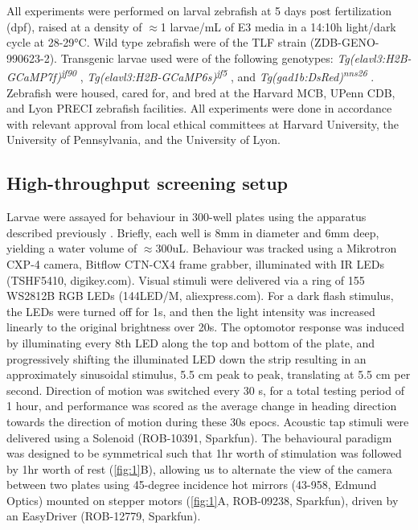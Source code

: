 \documentclass[9pt,lineno]{RandlettLab_elife}
\begin{document}
All experiments were performed on larval zebrafish at 5 days post fertilization (dpf), raised at a density of $\approx$1 larvae/mL of E3 media in a 14:10h light/dark cycle at 28-29°C. Wild type zebrafish were of the TLF strain (ZDB-GENO-990623-2). Transgenic larvae used were of the following genotypes: \emph{Tg(elavl3:H2B-GCaMP7f)\textsuperscript{jf90}} \cite{Yang2021-uf}, \emph{Tg(elavl3:H2B-GCaMP6s)\textsuperscript{jf5}} \cite{Freeman2014-yo}, and \emph{Tg(gad1b:DsRed)\textsuperscript{nns26}} \cite{Satou2013-af}. Zebrafish were housed, cared for, and bred at the Harvard MCB, UPenn CDB, and Lyon PRECI zebrafish facilities. All experiments were done in accordance with relevant approval from local ethical committees at Harvard University, the University of Pennsylvania, and the University of Lyon. 

\subsection{High-throughput screening setup}

Larvae were assayed for behaviour in 300-well plates using the apparatus described previously \cite{Randlett2019-fi}. Briefly, each well is 8mm in diameter and 6mm deep, yielding a water volume of $\approx$300uL. Behaviour was tracked using a Mikrotron CXP-4 camera, Bitflow CTN-CX4 frame grabber, illuminated with IR LEDs (TSHF5410, digikey.com).  Visual stimuli were delivered via a ring of 155 WS2812B RGB LEDs (144LED/M, aliexpress.com). For a dark flash stimulus, the LEDs were turned off for 1s, and then the light intensity was increased linearly to the original brightness over 20s. The optomotor response was induced by illuminating every 8th LED along the top and bottom of the plate, and progressively shifting the illuminated LED down the strip resulting in an approximately sinusoidal stimulus, 5.5 cm peak to peak, translating at 5.5 cm per second. Direction of motion was switched every 30 s, for a total testing period of 1 hour, and performance was scored as the average change in heading direction towards the direction of motion during these 30s epocs. Acoustic tap stimuli were delivered using a Solenoid (ROB-10391, Sparkfun). The behavioural paradigm was designed to be symmetrical such that 1hr worth of stimulation was followed by 1hr worth of rest (\autoref{fig:1}B), allowing us to alternate the view of the camera between two plates using 45-degree incidence hot mirrors (43-958, Edmund Optics) mounted on stepper motors (\autoref{fig:1}A, ROB-09238, Sparkfun), driven by an EasyDriver (ROB-12779, Sparkfun). 
\end{document}

